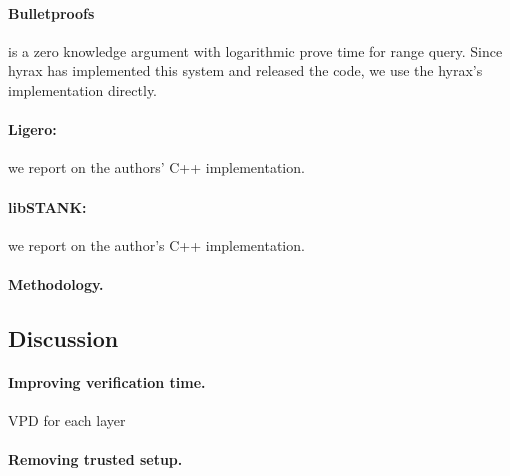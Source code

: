 \paragraph{Bulletproofs} is a zero knowledge argument with logarithmic prove time for range query. Since hyrax has implemented this system and released the code, we use the hyrax's implementation directly.\\
\paragraph{Ligero:} we report on the authors' C++ implementation.\\
\paragraph{libSTANK:} we report on the author's C++ implementation.\\
\paragraph{Methodology.}


\subsection{Discussion}

\paragraph{Improving verification time.}

VPD for each layer

\paragraph{Removing trusted setup.}